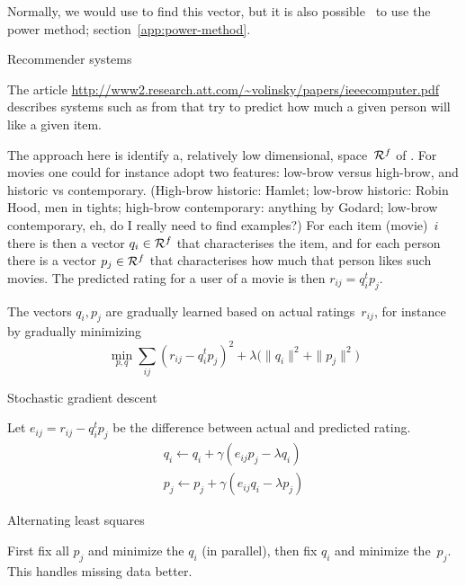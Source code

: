 Normally, we would use  to find this vector,
but it is also possible~\cite{LinCohen:PIC} to use the power method;
section~\ref{app:power-method}.


 {Recommender systems}

The article 
\url{http://www2.research.att.com/~volinsky/papers/ieeecomputer.pdf}
describes systems such as from 
that try to predict how much a given person will like a given item.

The approach here is identify a, relatively low dimensional, space~${\cal R}^f$
of . For movies one could for instance adopt two features:
low-brow versus high-brow, and historic vs contemporary.
(High-brow historic: Hamlet; low-brow historic: Robin Hood, men in tights; 
high-brow contemporary: anything by Godard; low-brow contemporary, eh, 
do I really need to find examples?)
For each item (movie)~$i$ there is then a vector $q_i\in{\cal R}^f$ that characterises
the item, and for each person there is a vector $p_j\in{\cal R}^f$ that
characterises how much that person likes such movies. The predicted rating
for a user of a movie is then $r_{ij}=q_i^tp_j$.

The vectors $q_i,p_j$ are gradually learned based on actual
ratings~$r_{ij}$, for instance by gradually minimizing
\[ \min_{p,q} \sum_{ij} (r_{ij}-q_i^tp_j)^2+
    \lambda \bigl( \|q_i\|^2+\|p_j\|^2 \bigr)
\]

 {Stochastic gradient descent}

Let $e_{ij}=r_{ij}-q_i^tp_j$ be the difference between actual and predicted rating.
\[
\begin{array}{l}
  q_i\leftarrow q_i+\gamma (e_{ij}p_j-\lambda q_i)\\
  p_j\leftarrow p_j+\gamma (e_{ij}q_i-\lambda p_j)
\end{array}
\]

 {Alternating least squares}

First fix all $p_j$ and minimize the $q_i$ (in parallel),
then fix $q_i$ and minimize the~$p_j$.
This handles missing data better.

